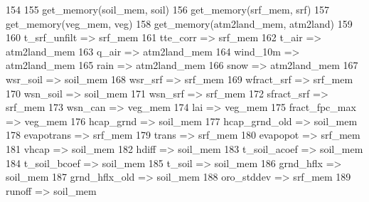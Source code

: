 \begin{DoxyCode}
154 
155     get\_memory(soil\_mem, soil)
156     get\_memory(srf\_mem, srf)
157     get\_memory(veg\_mem, veg)
158     get\_memory(atm2land\_mem, atm2land)
159 
160     t\_srf\_unfilt   => srf\_mem  %
161     tte\_corr       => srf\_mem  %
162     t\_air          => atm2land\_mem       %
163     q\_air          => atm2land\_mem       %
164     wind\_10m       => atm2land\_mem       %
165     rain           => atm2land\_mem       %
166     snow           => atm2land\_mem       %
167     wsr\_soil       => soil\_mem %
168     wsr\_srf        => srf\_mem  %
169     wfract\_srf     => srf\_mem  %
170     wsn\_soil       => soil\_mem %
171     wsn\_srf        => srf\_mem  %
172     sfract\_srf     => srf\_mem  %
173     wsn\_can        => veg\_mem  %
174     lai            => veg\_mem  %
175     fract\_fpc\_max  => veg\_mem  %
176     hcap\_grnd      => soil\_mem %
177     hcap\_grnd\_old  => soil\_mem %
178     evapotrans     => srf\_mem  %
179     trans          => srf\_mem  %
180     evapopot       => srf\_mem  %
181     vhcap          => soil\_mem %
182     hdiff          => soil\_mem %
183     t\_soil\_acoef   => soil\_mem %
184     t\_soil\_bcoef   => soil\_mem %
185     t\_soil         => soil\_mem %
186     grnd\_hflx      => soil\_mem %
187     grnd\_hflx\_old  => soil\_mem %
188     oro\_stddev     => srf\_mem  %
189     runoff         => soil\_mem %

\end{DoxyCode}
